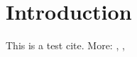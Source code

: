 \section{Introduction}

This is a test cite\cite{Ziemer_2012}. More: \cite{Izzo_2014}, \cite{gooding1990procedure}, \cite{brown2015run}
